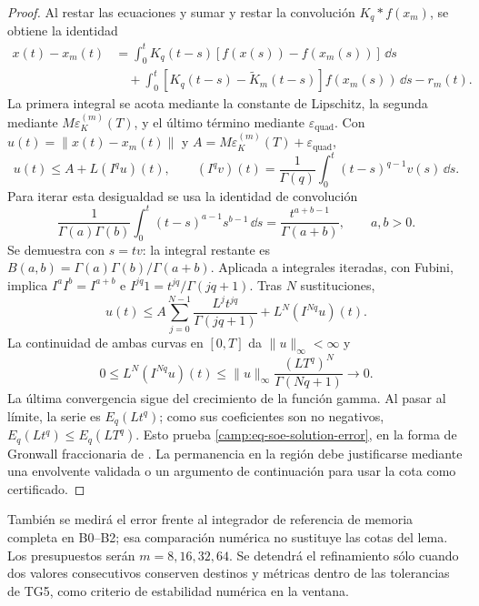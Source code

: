 \begin{proof}
Al restar las ecuaciones y sumar y restar la convolución
\(K_q*f(x_m)\), se obtiene la identidad
\begin{align*}
 x(t)-x_m(t)
 &=\int_0^tK_q(t-s)[f(x(s))-f(x_m(s))]\,\dd s\\
 &\quad+\int_0^t[K_q(t-s)-\widetilde K_m(t-s)]f(x_m(s))\,\dd s-r_m(t).
\end{align*}
La primera integral se acota mediante la constante de Lipschitz, la segunda
mediante \(M\varepsilon_K^{(m)}(T)\), y el último término mediante
\(\varepsilon_{\mathrm{quad}}\). Con
\(u(t)=\|x(t)-x_m(t)\|\) y
\(A=M\varepsilon_K^{(m)}(T)+\varepsilon_{\mathrm{quad}}\),
\[
 u(t)\leq A+L(I^qu)(t),\qquad
 (I^qv)(t)=\frac1{\Gamma(q)}\int_0^t(t-s)^{q-1}v(s)\,\dd s.
\]
Para iterar esta desigualdad se usa la identidad de convolución
\begin{equation}
 \frac1{\Gamma(a)\Gamma(b)}
 \int_0^t(t-s)^{a-1}s^{b-1}\,\dd s
 =\frac{t^{a+b-1}}{\Gamma(a+b)},\qquad a,b>0.
 \label{camp:eq-fractional-convolution}
\end{equation}
Se demuestra con \(s=tv\): la integral restante es
\(B(a,b)=\Gamma(a)\Gamma(b)/\Gamma(a+b)\). Aplicada a integrales iteradas,
con Fubini, implica \(I^aI^b=I^{a+b}\) e
\(I^{jq}1=t^{jq}/\Gamma(jq+1)\). Tras \(N\) sustituciones,
\[
 u(t)\leq A\sum_{j=0}^{N-1}\frac{L^jt^{jq}}{\Gamma(jq+1)}
             +L^N(I^{Nq}u)(t).
\]
La continuidad de ambas curvas en \([0,T]\) da \(\|u\|_\infty<\infty\) y
\[
 0\leq L^N(I^{Nq}u)(t)
 \leq\|u\|_\infty\frac{(LT^q)^N}{\Gamma(Nq+1)}\longrightarrow0.
\]
La última convergencia sigue del crecimiento de la función gamma. Al pasar
al límite, la serie es \(E_q(Lt^q)\); como sus coeficientes son no negativos,
\(E_q(Lt^q)\leq E_q(LT^q)\). Esto prueba
\cref{camp:eq-soe-solution-error}, en la forma de Gronwall fraccionaria de
\cite{Gomoyunov2018Convex}. La permanencia en la región debe justificarse
mediante una envolvente validada o un argumento de continuación para usar la
cota como certificado.
\end{proof}

También se medirá el error frente al integrador de referencia de memoria
completa en B0--B2; esa comparación numérica no sustituye las cotas del lema. Los
presupuestos serán \(m=8,16,32,64\). Se detendrá el refinamiento sólo cuando
dos valores consecutivos conserven destinos y métricas dentro de las
tolerancias de TG5, como criterio de estabilidad numérica en la ventana.

